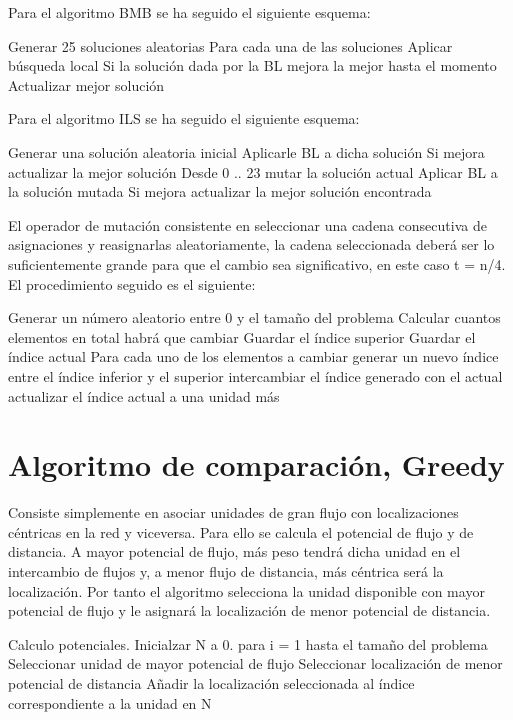 \documentclass[twoside]{article}
\begin{document}
Para el algoritmo BMB se ha seguido el siguiente esquema:

\begin{pythoncode}
Generar 25 soluciones aleatorias
    Para cada una de las soluciones
        Aplicar búsqueda local
        Si la solución dada por la BL mejora la mejor hasta el momento
            Actualizar mejor solución
\end{pythoncode}

Para el algoritmo ILS se ha seguido el siguiente esquema:

\begin{pythoncode}
Generar una solución aleatoria inicial
Aplicarle BL a dicha solución
Si mejora actualizar la mejor solución
Desde 0 .. 23
    mutar la solución actual
    Aplicar BL a la solución mutada
    Si mejora actualizar la mejor solución encontrada
\end{pythoncode}

El operador de mutación consistente en seleccionar una cadena
consecutiva de asignaciones y reasignarlas aleatoriamente, la cadena seleccionada
deberá ser lo suficientemente grande para que el cambio sea significativo, en
este caso t = n/4. El procedimiento seguido es el siguiente:

\begin{pythoncode}
Generar un número aleatorio entre 0 y el tamaño del problema
Calcular cuantos elementos en total habrá que cambiar
Guardar el índice superior
Guardar el índice actual
Para cada uno  de los elementos a cambiar
    generar un nuevo índice entre el índice inferior y el superior
    intercambiar el índice generado con el actual
    actualizar el índice actual a una unidad más
\end{pythoncode}

\section{Algoritmo de comparación, Greedy}

Consiste simplemente en asociar unidades de gran flujo con localizaciones céntricas en la red y viceversa. Para ello se calcula el potencial de flujo y de distancia. A mayor potencial de flujo, más peso tendrá dicha unidad en el intercambio de flujos y, a menor flujo de distancia, más céntrica será la localización. Por tanto el algoritmo selecciona la unidad disponible con mayor potencial de flujo y le asignará la localización de menor potencial de distancia.

\begin{pythoncode}
    Calculo potenciales.
    Inicialzar N a 0.
    para i = 1 hasta el tamaño del problema
        Seleccionar unidad de mayor potencial de flujo
        Seleccionar localización de menor potencial de distancia
        Añadir la localización seleccionada al índice correspondiente a la unidad en N
\end{pythoncode}
\end{document}
